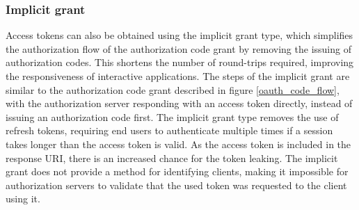 \subsubsection{Implicit grant}
\label{sec:background-oauth-implicit}
Access tokens can also be obtained using the implicit grant type, which simplifies the authorization flow of the authorization code grant by removing the issuing of authorization codes.
This shortens the number of round-trips required, improving the responsiveness of interactive applications.
The steps of the implicit grant are similar to the authorization code grant described in figure \ref{oauth_code_flow}, with the authorization server responding with an access token directly, instead of issuing an authorization code first.
The implicit grant type removes the use of refresh tokens, requiring end users to authenticate multiple times if a session takes longer than the access token is valid.
As the access token is included in the response URI, there is an increased chance for the token leaking.
The implicit grant does not provide a method for identifying clients, making it impossible for authorization servers to validate that the used token was requested to the client using it.
